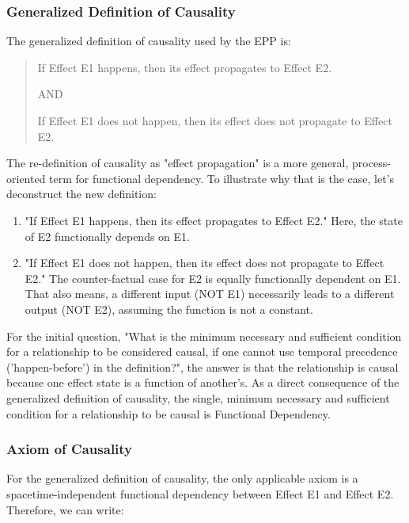 \subsubsection{Generalized Definition of Causality}

The generalized definition of causality used by the EPP is:

\begin{quote}
	If Effect E1 happens, then its effect propagates to Effect E2.

    AND
    
	If Effect E1 does not happen, then its effect does not propagate to Effect E2.
\end{quote}


The re-definition of causality as "effect propagation" is a more general, process-oriented term for functional dependency.
To illustrate why that is the case, let's deconstruct the new definition:


\begin{enumerate}
    \item "If Effect E1 happens, then its effect propagates to Effect E2." Here, the state of E2 functionally depends on E1.
    \item "If Effect E1 does not happen, then its effect does not propagate to Effect E2." The counter-factual case for E2 is equally functionally dependent on E1. That also means, a different input (NOT E1) necessarily leads to a different output (NOT E2), assuming the function is not a constant.
\end{enumerate}


For the initial question, "What is the minimum necessary and sufficient condition for a relationship to be considered causal, 
	if one cannot use temporal precedence ('happen-before') in the definition?", the answer is that the relationship is causal because one effect state is a function of another's. As a direct consequence of the generalized definition of causality, the single, minimum necessary and sufficient condition for a relationship to be causal is Functional Dependency. 

\subsubsection{Axiom of Causality}

 For the generalized definition of causality, the only applicable axiom is a spacetime-independent functional dependency between Effect E1 and Effect E2. Therefore, we can write:

